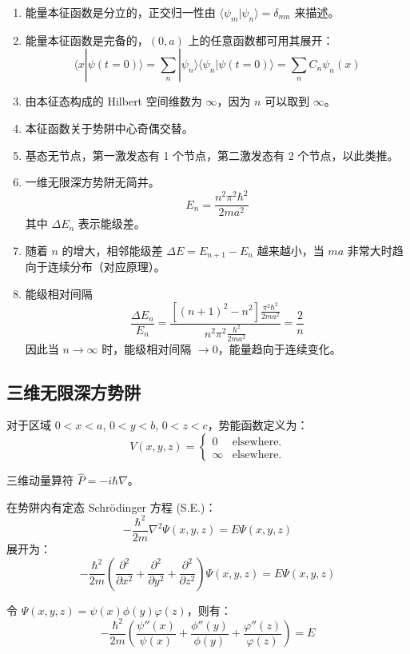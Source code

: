 \documentclass[lang=cn,10pt]{elegantbook}
\begin{document}
\begin{enumerate}
	\item 能量本征函数是分立的，正交归一性由 $\langle \psi_m | \psi_n \rangle = \delta_{mn}$ 来描述。
	\item 能量本征函数是完备的，$(0, a)$ 上的任意函数都可用其展开：
	\[
	\langle x | \psi(t=0) \rangle = \sum_n | \psi_n \rangle \langle \psi_n | \psi(t=0) \rangle = \sum_n C_n \psi_n(x)
	\]
	\item 由本征态构成的 Hilbert 空间维数为 $\infty$，因为 $n$ 可以取到 $\infty$。
	\item 本征函数关于势阱中心奇偶交替。
	\item 基态无节点，第一激发态有 1 个节点，第二激发态有 2 个节点，以此类推。
	\item 一维无限深方势阱无简并。
	\[
	E_n = \frac{n^2 \pi^2 \hbar^2}{2ma^2}
	\]
	其中 $\Delta E_n$ 表示能级差。
	
	\item 随着 $n$ 的增大，相邻能级差 $\Delta E = E_{n+1} - E_n$ 越来越小，当 $ma$ 非常大时趋向于连续分布（对应原理）。
	
	\item 能级相对间隔
	\[
	\frac{\Delta E_n}{E_n} = \frac{\left[(n+1)^2 - n^2\right] \frac{\pi^2 \hbar^2}{2ma^2}}{n^2 \pi^2 \frac{\hbar^2}{2ma^2}} = \frac{2}{n}
	\]
	因此当 $n \rightarrow \infty$ 时，能级相对间隔 $\rightarrow 0$，能量趋向于连续变化。
\end{enumerate}

\subsection{三维无限深方势阱}
对于区域 $0 < x < a$, $0 < y < b$, $0 < z < c$，势能函数定义为：
\[
V(x,y,z) = 
\begin{cases} 
	0 & \text{elsewhere.} \\
	\infty & \text{elsewhere.}
\end{cases}
\]

三维动量算符 $\hat{P} = -i\hbar\nabla$。

在势阱内有定态 Schrödinger 方程 (S.E.)：
\[
-\frac{\hbar^2}{2m} \nabla^2 \Psi(x,y,z) = E \Psi(x,y,z)
\]
展开为：
\[
-\frac{\hbar^2}{2m} \left( \frac{\partial^2}{\partial x^2} + \frac{\partial^2}{\partial y^2} + \frac{\partial^2}{\partial z^2} \right) \Psi(x,y,z) = E \Psi(x,y,z)
\]

令 $\Psi(x,y,z) = \psi(x) \phi(y) \varphi(z)$，则有：
\[
-\frac{\hbar^2}{2m} \left( \frac{\psi''(x)}{\psi(x)} + \frac{\phi''(y)}{\phi(y)} + \frac{\varphi''(z)}{\varphi(z)} \right) = E
\]
\end{document}
